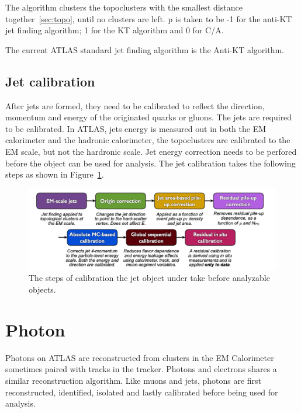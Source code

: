 The algorithm clusters the topoclusters with the smallest distance together~\ref{sec:topo}, until no clusters are left. p is taken to be -1 for the anti-KT jet finding algorithm; 1 for the KT algorithm and 0 for C/A. 

The current ATLAS standard jet finding algorithm is the Anti-KT algorithm.

\subsection{Jet calibration}
After jets are formed, they need to be calibrated to reflect the direction, momentum and energy of the originated quarks or gluons. The jets are required to be calibrated. In ATLAS, jets energy is measured out in both the EM calorimeter and the hadronic calorimeter, the topoclusters are calibrated to the EM scale, but not the hardronic scale. Jet energy correction needs to be perfored before the object can be used for analysis. The jet calibration takes the following steps as
shown in Figure~\ref{fig:JetCalibration}.

\begin{figure}[!htb]
    \begin{center}
        \includegraphics[width=1.1\textwidth]{figures/common_ana/JetCalibration}
        \caption{        
            The steps of calibration the jet object under take before analyzable objects\cite{Mehlhase:2770815}.
        }
        \label{fig:JetCalibration}
    \end{center}
\end{figure}

\section{Photon}
\label{sec:Photon}
Photons on ATLAS are reconstructed from clusters in the EM Calorimeter sometimes paired with tracks in the tracker. Photons and electrons shares a similar reconstruction algorithm. Like muons and jets, photons are first reconstructed, identified, isolated and lastly calibrated before being used for analysis. 

